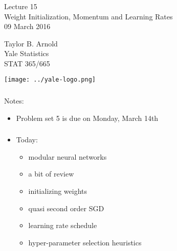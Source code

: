 \documentclass[xetex,mathserif,serif,aspectratio=169]{beamer}
\begin{document}
\begin{frame}[fragile] \frametitle{} \oldB \small

\vfill

{\fontsize{0.7cm}{0cm}\selectfont Lecture 15 \\\vspace{0.2cm} Weight Initialization,
Momentum and Learning Rates}\\\vspace{0.5cm}
09 March 2016

\vspace{2cm}

\begin{minipage}{0.6\textwidth}
Taylor B. Arnold \\
Yale Statistics \\
STAT 365/665
\end{minipage}
\hfill
\begin{minipage}{0.3\textwidth}\raggedleft
\texttt{[image: ../yale-logo.png]}
\end{minipage}%

\end{frame}

\begin{frame}[fragile] \frametitle{} \oldB \small

Notes:
\begin{itemize}
\item Problem set 5 is due on Monday, March 14th
\end{itemize}

\end{frame}

\begin{frame}[fragile] \frametitle{} \oldB \small

\begin{itemize}
\item Today:
\begin{itemize}
\item modular neural networks
\item a bit of review
\item initializing weights
\item quasi second order SGD
\item learning rate schedule
\item hyper-parameter selection heuristics
\end{itemize}
\end{itemize}

\end{frame}
\end{document}
